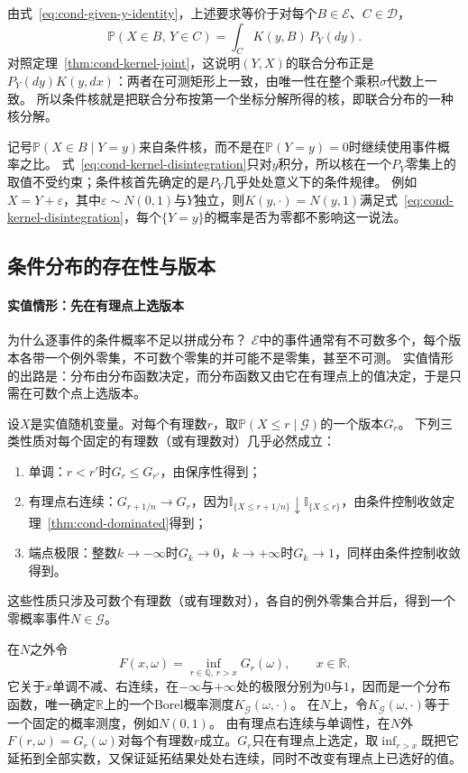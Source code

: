 由式~\eqref{eq:cond-given-y-identity}，上述要求等价于对每个$B\in\mathcal E$、$C\in\mathcal D$，
\begin{equation}
  \mathbb P(X\in B,\,Y\in C)=\int_CK(y,B)\,P_Y(dy).
  \label{eq:cond-kernel-disintegration}
\end{equation}
对照定理~\ref{thm:cond-kernel-joint}，这说明$(Y,X)$的联合分布正是$P_Y(dy)K(y,dx)$：两者在可测矩形上一致，由唯一性在整个乘积$\sigma$代数上一致。
所以条件核就是把联合分布按第一个坐标分解所得的核，即联合分布的一种核分解。

记号$\mathbb P(X\in B\mid Y=y)$来自条件核，而不是在$\mathbb P(Y=y)=0$时继续使用事件概率之比。
式~\eqref{eq:cond-kernel-disintegration}只对$y$积分，所以核在一个$P_Y$零集上的取值不受约束；条件核首先确定的是$P_Y$几乎处处意义下的条件规律。
例如$X=Y+\varepsilon$，其中$\varepsilon\sim N(0,1)$与$Y$独立，则$K(y,\cdot)=N(y,1)$满足式~\eqref{eq:cond-kernel-disintegration}，每个$\{Y=y\}$的概率是否为零都不影响这一说法。

\subsection{条件分布的存在性与版本}

\paragraph{实值情形：先在有理点上选版本}
为什么逐事件的条件概率不足以拼成分布？
$\mathcal E$中的事件通常有不可数多个，每个版本各带一个例外零集，不可数个零集的并可能不是零集，甚至不可测。
实值情形的出路是：分布由分布函数决定，而分布函数又由它在有理点上的值决定，于是只需在可数个点上选版本。

设$X$是实值随机变量。对每个有理数$r$，取$\mathbb P(X\leq r\mid\mathcal G)$的一个版本$G_r$。
下列三类性质对每个固定的有理数（或有理数对）几乎必然成立：
\begin{enumerate}
  \item 单调：$r<r'$时$G_r\leq G_{r'}$，由保序性得到；
  \item 有理点右连续：$G_{r+1/n}\to G_r$，因为$\mathbb I_{\{X\leq r+1/n\}}\downarrow\mathbb I_{\{X\leq r\}}$，由条件控制收敛定理~\ref{thm:cond-dominated}得到；
  \item 端点极限：整数$k\to-\infty$时$G_k\to0$，$k\to+\infty$时$G_k\to1$，同样由条件控制收敛得到。
\end{enumerate}
这些性质只涉及可数个有理数（或有理数对），各自的例外零集合并后，得到一个零概率事件$N\in\mathcal G$。

在$N$之外令
\[
  F(x,\omega)=\inf_{r\in\mathbb Q,\,r>x}G_r(\omega),\qquad x\in\mathbb R.
\]
它关于$x$单调不减、右连续，在$-\infty$与$+\infty$处的极限分别为$0$与$1$，因而是一个分布函数，唯一确定$\mathbb R$上的一个Borel概率测度$K_{\mathcal G}(\omega,\cdot)$。
在$N$上，令$K_{\mathcal G}(\omega,\cdot)$等于一个固定的概率测度，例如$N(0,1)$。
由有理点右连续与单调性，在$N$外$F(r,\omega)=G_r(\omega)$对每个有理数$r$成立。$G_r$只在有理点上选定，取$\inf_{r>x}$既把它延拓到全部实数，又保证延拓结果处处右连续，同时不改变有理点上已选好的值。

